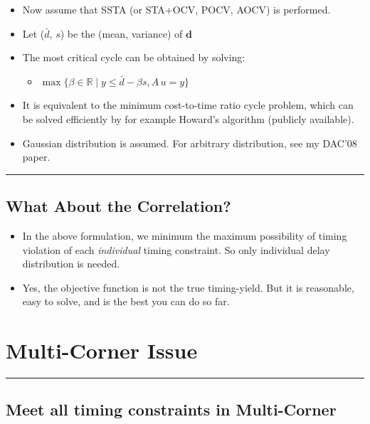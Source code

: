 \documentclass[
]{article}
\providecommand{\tightlist}{%
  \setlength{\itemsep}{0pt}\setlength{\parskip}{0pt}}
\begin{document}
\begin{itemize}
\tightlist
\item
  Now assume that SSTA (or STA+OCV, POCV, AOCV) is performed.
\item
  Let (\(\bar{d}\), \(s\)) be the (mean, variance) of \(\mathbf{d}\)
\item
  The most critical cycle can be obtained by solving:

  \begin{itemize}
  \tightlist
  \item
    \(\max\{\beta \in \mathbb{R} \mid y \leq \bar{d} - \beta s, A\,u = y\}\)
  \end{itemize}
\item
  It is equivalent to the minimum cost-to-time ratio cycle problem,
  which can be solved efficiently by for example Howard's algorithm
  (publicly available).
\item
  Gaussian distribution is assumed. For arbitrary distribution, see my
  DAC'08 paper.
\end{itemize}

\begin{center}\rule{0.5\linewidth}{0.5pt}\end{center}

\subsection{What About the Correlation?}\label{what-about-the-correlation}

\begin{itemize}
\tightlist
\item
  In the above formulation, we minimum the maximum possibility of
  timing violation of each \emph{individual} timing constraint. So only
  individual delay distribution is needed.
\item
  Yes, the objective function is not the true timing-yield. But it is
  reasonable, easy to solve, and is the best you can do so far.
\end{itemize}

\section{Multi-Corner Issue}\label{multi-corner-issue}

\begin{center}\rule{0.5\linewidth}{0.5pt}\end{center}

\subsection{Meet all timing constraints in Multi-Corner}\label{meet-all-timing-constraints-in-multi-corner}
\end{document}
